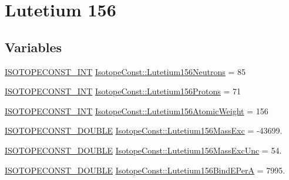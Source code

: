 \hypertarget{group___isotope_const-_lutetium-_lu156}{}\section{Lutetium 156}
\label{group___isotope_const-_lutetium-_lu156}
\subsection*{Variables}
\begin{DoxyCompactItemize}
\item 
\mbox{\hyperlink{group___isotope_const-_macros_ga5f18360b3e99483a35c32d789e62621c}{I\+S\+O\+T\+O\+P\+E\+C\+O\+N\+S\+T\+\_\+\+I\+NT}} \mbox{\hyperlink{group___isotope_const-_lutetium-_lu156_ga3f8317be32c398d31b3976a071db1c1b}{Isotope\+Const\+::\+Lutetium156\+Neutrons}} = 85
\item 
\mbox{\hyperlink{group___isotope_const-_macros_ga5f18360b3e99483a35c32d789e62621c}{I\+S\+O\+T\+O\+P\+E\+C\+O\+N\+S\+T\+\_\+\+I\+NT}} \mbox{\hyperlink{group___isotope_const-_lutetium-_lu156_ga9159b4423b3970e76d4efdbf058352f0}{Isotope\+Const\+::\+Lutetium156\+Protons}} = 71
\item 
\mbox{\hyperlink{group___isotope_const-_macros_ga5f18360b3e99483a35c32d789e62621c}{I\+S\+O\+T\+O\+P\+E\+C\+O\+N\+S\+T\+\_\+\+I\+NT}} \mbox{\hyperlink{group___isotope_const-_lutetium-_lu156_gaa924afe0e80d18a6f1cce9a992451cdf}{Isotope\+Const\+::\+Lutetium156\+Atomic\+Weight}} = 156
\item 
\mbox{\hyperlink{group___isotope_const-_macros_ga8f45a7272ce02c0b4c65c44636ed719a}{I\+S\+O\+T\+O\+P\+E\+C\+O\+N\+S\+T\+\_\+\+D\+O\+U\+B\+LE}} \mbox{\hyperlink{group___isotope_const-_lutetium-_lu156_ga80cf35b0fd833955275eff56c2d0803c}{Isotope\+Const\+::\+Lutetium156\+Mass\+Exc}} = -\/43699.
\item 
\mbox{\hyperlink{group___isotope_const-_macros_ga8f45a7272ce02c0b4c65c44636ed719a}{I\+S\+O\+T\+O\+P\+E\+C\+O\+N\+S\+T\+\_\+\+D\+O\+U\+B\+LE}} \mbox{\hyperlink{group___isotope_const-_lutetium-_lu156_ga54ebdeae4bb29597cd8501d77f73f8e0}{Isotope\+Const\+::\+Lutetium156\+Mass\+Exc\+Unc}} = 54.
\item 
\mbox{\hyperlink{group___isotope_const-_macros_ga8f45a7272ce02c0b4c65c44636ed719a}{I\+S\+O\+T\+O\+P\+E\+C\+O\+N\+S\+T\+\_\+\+D\+O\+U\+B\+LE}} \mbox{\hyperlink{group___isotope_const-_lutetium-_lu156_gaeb6f55f8be43504d1ec128d8a234ce29}{Isotope\+Const\+::\+Lutetium156\+Bind\+E\+PerA}} = 7995.
\item 

\end{DoxyCompactItemize}
